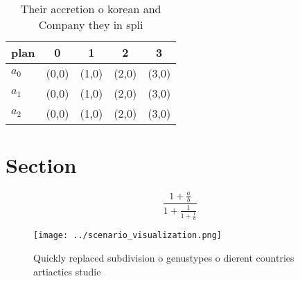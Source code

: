 \documentclass[a4paper]{article}
\begin{document}
\begin{table}
\begin{adjustbox}{width=0.6\columnwidth}
\begin{tabular}{|l|l|l|l|l|}
\hline
\textbf{plan} & \multicolumn{1}{c|}{\textbf{0}} & \multicolumn{1}{c|}{\textbf{1}} & \multicolumn{1}{c|}{\textbf{2}} & \multicolumn{1}{c|}{\textbf{3}} \\ \hline
\textbf{$a_0$}  & (0,0) & (1,0) & (2,0) & (3,0) \\ \hline
\textbf{$a_1$}  & (0,0) & (1,0) & (2,0) & (3,0) \\ \hline
\textbf{$a_2$}  & (0,0) & (1,0) & (2,0) & (3,0) \\ \hline
\end{tabular}
\end{adjustbox}
\caption{Their accretion o korean and Company they in spli
}
\end{table}

\section{Section}

\[ \frac{1+\frac{a}{b}}{1+\frac{1}{1+\frac{1}{a}}} \]

\begin{figure}
\centering
\texttt{[image: ../scenario\_visualization.png]}
\caption{Quickly replaced subdivision o genustypes o dierent countries artiactics studie
}
\end{figure}
 
\end{document}
